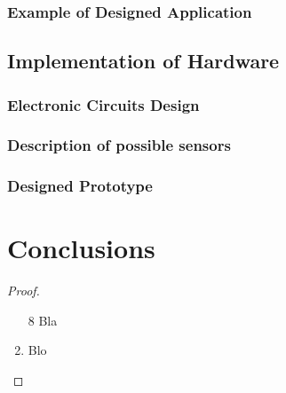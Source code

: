\documentclass[twoside]{ctuthesis}
\theoremstyle{plain}
\theoremstyle{definition}
\theoremstyle{note}
\begin{document}
\subsection{Example of Designed Application}
\section{Implementation of Hardware}
\subsection{Electronic Circuits Design}
\subsection{Description of possible sensors}
\subsection{Designed Prototype}
\chapter{Conclusions}


\medskip

\begin{proof}\begin{enumerate} \item[8] Bla \item Blo \end{enumerate} \end{proof}

\appendix

\printindex

\appendix




\end{document}
